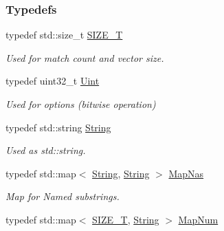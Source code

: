 \subsubsection*{Typedefs}
\begin{DoxyCompactItemize}
\item 
typedef std\+::size\+\_\+t \hyperlink{namespacejpcre2_a2aac465ddcb123560c7c8215dd69246c}{S\+I\+Z\+E\+\_\+T}\hypertarget{namespacejpcre2_a2aac465ddcb123560c7c8215dd69246c}{}\label{namespacejpcre2_a2aac465ddcb123560c7c8215dd69246c}

\begin{DoxyCompactList}\small\item\em Used for match count and vector size. \end{DoxyCompactList}\item 
typedef uint32\+\_\+t \hyperlink{namespacejpcre2_a078242d38221a13fb3543b9edd78c099}{Uint}\hypertarget{namespacejpcre2_a078242d38221a13fb3543b9edd78c099}{}\label{namespacejpcre2_a078242d38221a13fb3543b9edd78c099}

\begin{DoxyCompactList}\small\item\em Used for options (bitwise operation) \end{DoxyCompactList}\item 
typedef std\+::string \hyperlink{namespacejpcre2_a91f03070152fb228bc116c5a737f1d16}{String}\hypertarget{namespacejpcre2_a91f03070152fb228bc116c5a737f1d16}{}\label{namespacejpcre2_a91f03070152fb228bc116c5a737f1d16}

\begin{DoxyCompactList}\small\item\em Used as std\+::string. \end{DoxyCompactList}\item 
typedef std\+::map$<$ \hyperlink{namespacejpcre2_a91f03070152fb228bc116c5a737f1d16}{String}, \hyperlink{namespacejpcre2_a91f03070152fb228bc116c5a737f1d16}{String} $>$ \hyperlink{namespacejpcre2_a20bd901c9ca3c949806aa6b9e324f6cf}{Map\+Nas}\hypertarget{namespacejpcre2_a20bd901c9ca3c949806aa6b9e324f6cf}{}\label{namespacejpcre2_a20bd901c9ca3c949806aa6b9e324f6cf}

\begin{DoxyCompactList}\small\item\em Map for Named substrings. \end{DoxyCompactList}\item 
typedef std\+::map$<$ \hyperlink{namespacejpcre2_a2aac465ddcb123560c7c8215dd69246c}{S\+I\+Z\+E\+\_\+T}, \hyperlink{namespacejpcre2_a91f03070152fb228bc116c5a737f1d16}{String} $>$ \hyperlink{namespacejpcre2_a947e37f0e4a1678157e7f1f855638e82}{Map\+Num}\hypertarget{namespacejpcre2_a947e37f0e4a1678157e7f1f855638e82}{}\label{namespacejpcre2_a947e37f0e4a1678157e7f1f855638e82}


\end{DoxyCompactItemize}
